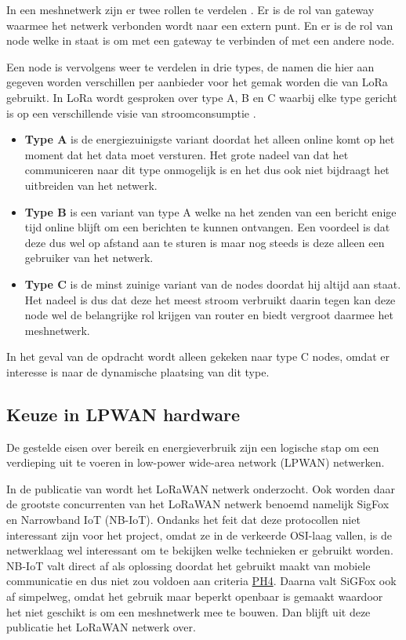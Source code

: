 \documentclass[a4paper, 11pt, oneside]{report}
\begin{document}
In een meshnetwerk zijn er twee rollen te verdelen \cite{compNRF}.
Er is de rol van gateway waarmee het netwerk verbonden wordt naar een extern punt. 
En er is de rol van node welke in staat is om met een gateway te verbinden of met een andere node.

Een node is vervolgens weer te verdelen in drie types, de namen die hier aan gegeven worden verschillen per aanbieder voor het gemak worden die van LoRa gebruikt.
In LoRa wordt gesproken over type A, B en C waarbij elke type gericht is op een verschillende visie van stroomconsumptie \cite{LoraLimit}.

\begin{itemize}
	\item \textbf{Type A} is de energiezuinigste variant doordat het alleen online komt op het moment dat het data moet versturen.
Het grote nadeel van dat het communiceren naar dit type onmogelijk is en het dus ook niet bijdraagt het uitbreiden van het netwerk.
	\item \textbf{Type B} is een variant van type A welke na het zenden van een bericht enige tijd online blijft om een berichten te kunnen ontvangen. 
Een voordeel is dat deze dus wel op afstand aan te sturen is maar nog steeds is deze alleen een gebruiker van het netwerk.
	\item \textbf{Type C} is de minst zuinige variant van de nodes doordat hij altijd aan staat.
Het nadeel is dus dat deze het meest stroom verbruikt daarin tegen kan deze node wel de belangrijke rol krijgen van router en biedt vergroot daarmee het meshnetwerk.
\end{itemize}

In het geval van de opdracht wordt alleen gekeken naar type C nodes, omdat er interesse is naar de dynamische plaatsing van dit type.




\subsection{Keuze in LPWAN hardware}
De gestelde eisen over bereik en energieverbruik zijn een logische stap om een verdieping uit te voeren in low-power wide-area network (LPWAN) netwerken. 

In de publicatie van \cite{LoraConnect} wordt het LoRaWAN netwerk onderzocht.
Ook worden daar de grootste concurrenten van het LoRaWAN netwerk benoemd namelijk SigFox \citeyear{sigfox} en Narrowband IoT (NB-IoT).
Ondanks het feit dat deze protocollen niet interessant zijn voor het project, omdat ze in de verkeerde OSI-laag vallen, is de netwerklaag wel interessant om te bekijken welke technieken er gebruikt worden.
NB-IoT valt direct af als oplossing doordat het gebruikt maakt van mobiele communicatie en dus niet zou voldoen aan criteria \hyperlink{ph4}{PH4}.
Daarna valt SiGFox ook af simpelweg, omdat het gebruik maar beperkt openbaar is gemaakt waardoor het niet geschikt is om een meshnetwerk mee te bouwen. 
Dan blijft uit deze publicatie het LoRaWAN netwerk over. 
\end{document}
